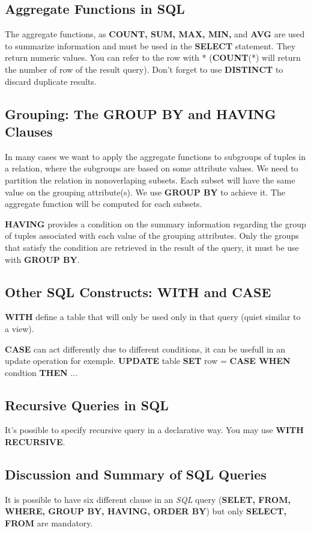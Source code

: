 \subsection{Aggregate Functions in SQL}
The aggregate functions, as \textbf{COUNT, SUM, MAX, MIN,} and \textbf{AVG} are used to summarize information and must be used in the \textbf{SELECT} statement. They return numeric values. You can refer to the row with * (\textbf{COUNT}(*) will return the number of row of the result query). Don't forget to use \textbf{DISTINCT} to discard duplicate results.
\subsection{Grouping: The GROUP BY and HAVING Clauses}
In many cases we want to apply the aggregate functions to subgroups of tuples in a relation, where the subgroups are based on some attribute values. We need to partition the relation in nonoverlaping subsets. Each subset will have the same value on the grouping attribute(s). We use \textbf{GROUP BY} to achieve it. The aggregate function will be computed for each subsets.

\textbf{HAVING} provides a condition on the summary information regarding the group of tuples associated with each value of the grouping attributes. Only the groups that satisfy the condition are retrieved in the result of the query, it must be use with \textbf{GROUP BY}.

\subsection{Other SQL Constructs: WITH and CASE}
\textbf{WITH} define a table that will only be used only in that query (quiet similar to a view). 

\textbf{CASE} can act differently due to different conditions, it can be usefull in an update operation for exemple. 
\textbf{UPDATE} table \textbf{SET} row = \textbf{CASE WHEN} condtion \textbf{THEN} ...
\subsection{Recursive Queries in SQL}
It's possible to specify recursive query in a declarative way. You may use \textbf{WITH RECURSIVE}.

\subsection{Discussion and Summary of SQL Queries}
It is possible to have six different clause in an \textit{SQL} query (\textbf{SELET, FROM, WHERE, GROUP BY, HAVING, ORDER BY}) but only \textbf{SELECT, FROM} are mandatory. 



